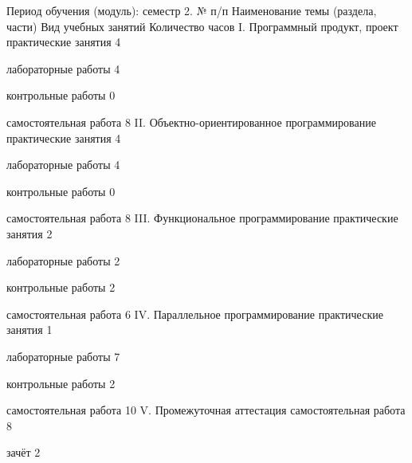 Период обучения (модуль): семестр 2.
№ п/п
Наименование темы (раздела, части)
Вид учебных занятий
Количество часов
I.
Программный продукт, проект
практические занятия
4


лабораторные работы
4


контрольные работы
0


самостоятельная работа
8
II.
Объектно-ориентированное программирование
практические занятия
4


лабораторные работы
4


контрольные работы
0


самостоятельная работа
8
III.
Функциональное программирование
практические занятия
2


лабораторные работы
2


контрольные работы
2


самостоятельная работа
6
IV.
Параллельное программирование
практические занятия
1


лабораторные работы
7


контрольные работы
2


самостоятельная работа
10
V.
Промежуточная аттестация
самостоятельная работа
8


зачёт
2

